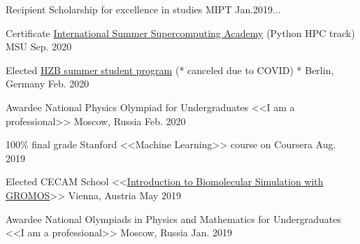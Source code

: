 
\begin{cvhonors}

  \cvhonor
    {Recipient} %
    {Scholarship for excellence in studies} %
    {MIPT} %
    {Jan.2019...} %

  \cvhonor
    {Certificate} %
    {\href{http://academy.hpc-russia.ru/en/organizers}{International Summer Supercomputing Academy} (Python HPC track)} %
    {MSU} %
    {Sep. 2020} %
        
  \cvhonor
    {Elected} %
    {\href{https://www.helmholtz-berlin.de/jobskarriere/sommerstudenten/index_en.html}{HZB summer student program} (* canceled due to COVID)} %
    {* Berlin, Germany} %
    {Feb. 2020} %
    
  \cvhonor
    {Awardee} %
    {National Physics Olympiad for Undergraduates <<I am a professional>>} %
    {Moscow, Russia} %
    {Feb. 2020} %
        
  \cvhonor
    {100\% final grade} %
    {Stanford <<Machine Learning>> course on Coursera} %
    {} %
    {Aug. 2019} %
    
  \cvhonor
    {Elected} %
    {CECAM School <<\href{https://www.cecam.org/workshop-details/129}{Introduction to Biomolecular Simulation with GROMOS}>>} %
    {Vienna, Austria} %
    {May 2019} %
        
    
  \cvhonor
    {Awardee} %
    {National Olympiads in Physics and Mathematics for Undergraduates <<I am a professional>>} %
    {Moscow, Russia} %
    {Jan. 2019} %
    

\end{cvhonors}
